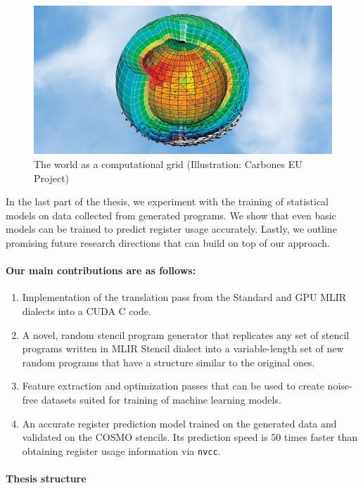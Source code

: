 \documentclass[sigplan,\review anonymous]{acmart}
\begin{document}
\begin{figure}
  \centering
  \includegraphics[width=\columnwidth]{images/weather_simulation_earth.jpg}
  \caption{ The world as a computational grid (Illustration: Carbones EU
  Project)}
  \label{fig:weather_simulation_earth}
\end{figure}

In the last part of the thesis, we experiment with the training of statistical
models on data collected from generated programs. We show that even basic
models can be trained to predict register usage accurately. Lastly, we outline
promising future research directions that can build on top of our approach. 

\paragraph{Our main contributions are as follows:}
\begin{enumerate}
  \item Implementation of the translation pass from the Standard and GPU MLIR
  dialects into a CUDA C code.
  \item A novel, random stencil program generator that replicates any set of
  stencil programs written in MLIR Stencil dialect into a variable-length set
  of new random programs that have a structure similar to the original ones.
  \item Feature extraction and optimization passes that can be used to create
  noise-free datasets suited for training of machine learning models.
  \item An accurate register prediction model trained on the generated data
  and validated on the COSMO stencils. Its prediction speed is 50 times
  faster than obtaining register usage information via \texttt{nvcc}.
\end{enumerate}

\paragraph{Thesis structure}
\end{document}
